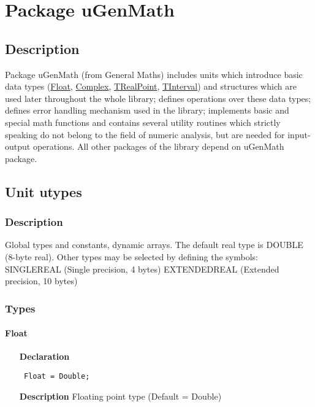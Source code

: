 \documentclass[12pt,a4paper,oneside]{report}
\newcommand{\declarationitem}[1]{\textbf{#1}}
\newcommand{\descriptiontitle}[1]{\textbf{#1}}
\newcommand{\code}[1]{\texttt{#1}}
\begin{document}
\chapter{Package uGenMath}\label{package-ugenmath}
\section{Description}
Package uGenMath (from General Maths) includes units which introduce basic data types (\hyperref[utypes-Float]{Float}, \hyperref[utypes-complex]{Complex}, \hyperref[types:trealpoint]{TRealPoint}, \hyperref[uIntervals.TInterval]{TInterval}) and structures which are used later throughout the whole library; defines operations over these data types; defines error handling mechanism used in the library; implements basic and special math functions and contains several utility routines which strictly speaking do not belong to the field of numeric analysis, but are needed for input-output operations. All other packages of the library depend on uGenMath package.  


\section{Unit utypes}
\label{utypes}
\subsection{Description}
Global types and constants, dynamic arrays. The default real type is DOUBLE (8{-}byte real). Other types may be selected by defining the symbols:
SINGLEREAL (Single precision, 4 bytes) EXTENDEDREAL (Extended precision, 10 bytes) \subsection{Types}
\subsubsection{Float}
\label{utypes-Float}
\begin{itemize}\item[\declarationitem{Declaration}\hfill]
	\begin{flushleft}
		\code{
			Float = Double;}
		
	\end{flushleft}
	
	\par
	\item[\descriptiontitle{Description}]
	Floating point type (Default = Double)
\end{itemize}
\end{document}
